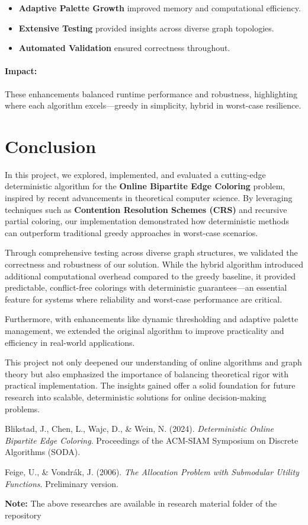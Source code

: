 \documentclass[11pt]{article}
\begin{document}
\begin{itemize}
    \item \textbf{Adaptive Palette Growth} improved memory and computational efficiency.
    \item \textbf{Extensive Testing} provided insights across diverse graph topologies.
    \item \textbf{Automated Validation} ensured correctness throughout.
\end{itemize}

\paragraph{Impact:} These enhancements balanced runtime performance and robustness, highlighting where each algorithm excels—greedy in simplicity, hybrid in worst-case resilience.


\section{Conclusion}

In this project, we explored, implemented, and evaluated a cutting-edge deterministic algorithm for the \textbf{Online Bipartite Edge Coloring} problem, inspired by recent advancements in theoretical computer science. By leveraging techniques such as \textbf{Contention Resolution Schemes (CRS)} and recursive partial coloring, our implementation demonstrated how deterministic methods can outperform traditional greedy approaches in worst-case scenarios.

Through comprehensive testing across diverse graph structures, we validated the correctness and robustness of our solution. While the hybrid algorithm introduced additional computational overhead compared to the greedy baseline, it provided predictable, conflict-free colorings with deterministic guarantees—an essential feature for systems where reliability and worst-case performance are critical.

Furthermore, with enhancements like dynamic thresholding and adaptive palette management, we extended the original algorithm to improve practicality and efficiency in real-world applications.

This project not only deepened our understanding of online algorithms and graph theory but also emphasized the importance of balancing theoretical rigor with practical implementation. The insights gained offer a solid foundation for future research into scalable, deterministic solutions for online decision-making problems.

\begin{thebibliography}{9}

Blikstad, J., Chen, L., Wajc, D., \& Wein, N. (2024). \textit{Deterministic Online Bipartite Edge Coloring}. Proceedings of the ACM-SIAM Symposium on Discrete Algorithms (SODA).

Feige, U., \& Vondrák, J. (2006). \textit{The Allocation Problem with Submodular Utility Functions}. Preliminary version.

\textbf{Note: }The above researches are available in research material folder of the repository


\end{thebibliography}
\end{document}

